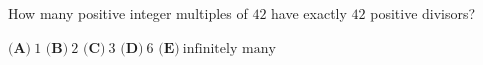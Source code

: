 How many positive integer multiples of $42$ have exactly $42$ positive divisors?

$\textbf{(A)}\ 1$ \qquad $\textbf{(B)}\ 2$ \qquad $\textbf{(C)}\ 3$ \qquad $\textbf{(D)}\ 6$ \qquad $\textbf{(E)}\ \text{infinitely many}$
